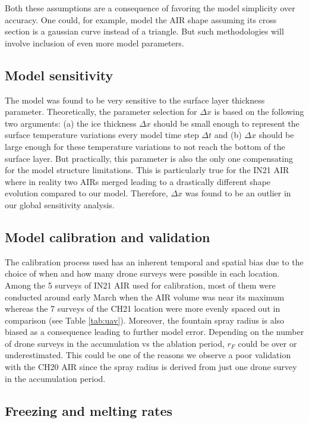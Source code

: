 \documentclass[utf8]{frontiersSCNS}
\begin{document}
Both these assumptions are a consequence of favoring the model simplicity over accuracy. One could, for example,
model the AIR shape assuming its cross section is a gaussian curve instead of a triangle.  But such
methodologies will involve inclusion of even more model parameters.

\subsection{Model sensitivity}

The model was found to be very sensitive to the surface layer thickness parameter. Theoretically, the parameter
selection for $\Delta x$ is based on the following two arguments: (a) the ice thickness $\Delta x$ should be
small enough to represent the surface temperature variations every model time step $\Delta t$ and (b) $\Delta x$
should be large enough for these temperature variations to not reach the bottom of the surface layer. But
practically, this parameter is also the only one compensating for the model structure limitations. This is
particularly true for the IN21 AIR where in reality two AIRs merged leading to a drastically different shape
evolution compared to our model. Therefore, $\Delta x$ was found to be an outlier in our global sensitivity
analysis. 

\subsection{Model calibration and validation}

The calibration process used has an inherent temporal and spatial bias due to the choice of when and how many
drone surveys were possible in each location. Among the 5 surveys of IN21 AIR used for calibration, most of them
were conducted around early March when the AIR volume was near its maximum whereas the 7 surveys of the CH21
location were more evenly spaced out in comparison (see Table \ref{tab:uav}). Moreover, the fountain spray
radius is also biased as a consequence leading to further model error. Depending on the number of drone surveys
in the accumulation vs the ablation period, $r_F$ could be over or underestimated. This could be one of the
reasons we observe a poor validation with the CH20 AIR since the spray radius is derived from just one drone
survey in the accumulation period.

\subsection{Freezing and melting rates}
\end{document}
